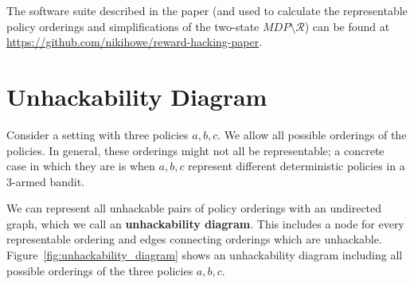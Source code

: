 The software suite described in the paper (and used to calculate the representable policy orderings and simplifications of the two-state $MDP \setminus \mathcal{R}$) can be found at \url{https://github.com/nikihowe/reward-hacking-paper}.


















    
    
    
    



























































\section{Unhackability Diagram}
\label{sec:hackability_diagram}


Consider a setting with three policies $a, b, c$. We allow all possible orderings of the policies.
In general, these orderings might not all be representable; a concrete case in which they are is when $a, b, c$ represent different deterministic policies in a 3-armed bandit.

We can represent all unhackable pairs of policy orderings with an undirected graph, which we call an \textbf{unhackability diagram}. This includes a node for every representable ordering and edges connecting orderings which are unhackable.
Figure~\ref{fig:unhackability_diagram} shows an unhackability diagram including all possible orderings of the three policies $a, b, c$.

